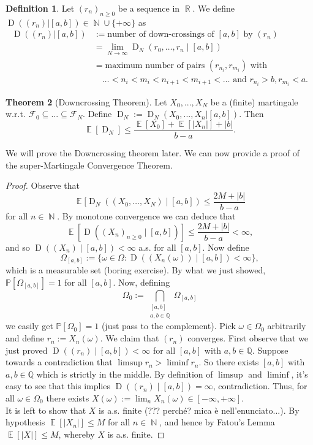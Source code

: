 \documentclass[12pt,a4paper]{report}
\theoremstyle{definition}
\newtheorem{theorem}{Theorem}[chapter] %
\newtheorem{definition}[theorem]{Definition}
\theoremstyle{num.custom-title}
\DeclareMathOperator{\E}{\mathbb{E}}
\DeclareMathOperator{\N}{\mathbb{N}}
\DeclareMathOperator{\R}{\mathbb{R}}
\DeclareMathOperator{\sse}{\subseteq}
\DeclareMathOperator{\D}{D}
\newcommand{\F}{\mathcal{F}}
\newcommand{\Q}{\mathbb{Q}}
\renewcommand{\1}{\mathbbm{1}}
\renewcommand{\P}{\mathbb{P}}
\begin{document}
\begin{definition}
	Let $(r_n)_{n \geq 0}$ be a sequence in $\R$. We define $\D((r_n)|[a,b]) \in \N \cup \{+\infty\}$ as
	\begin{align*}
	\D((r_n)|[a,b])
	&:= \text{number of down-crossings of $[a,b]$ by $(r_n)$} \\
	&= \lim_{N \to \infty} \D_N(r_0,\ldots,r_n \mid [a,b]) \\
	&= \text{maximum number of pairs $(r_{n_i},r_{m_i})$ with} \\
	&\quad \ldots < n_i < m_i < n_{i+1} < m_{i+1} < \ldots \text{ and } r_{n_i} > b, r_{m_i} < a.
	\end{align*}
\end{definition}

\begin{theorem}[Downcrossing Theorem]
	Let $X_0,...,X_N$ be a (finite) martingale w.r.t. $\F_0 \sse ... \sse \F_N$. Define $\D_N := \D_N(X_0,...,X_n | [a,b])$. Then
	\[
	\E[\D_N] \leq \frac{\E[X_0] + \E[|X_n|] + |b|}{b-a}.
	\]
\end{theorem}

We will prove the Downcrossing theorem later. We can now provide a proof of the super-Martingale Convergence Theorem.

\begin{proof}
	Observe that 
	\[
	\E[\D_N( (X_0,\ldots,X_N) \mid [a,b]) \leq \frac{2M+|b|}{b-a}
	\]
	for all $n \in \N$. By monotone convergence we can deduce that
	\[
	\E[\D( (X_n)_{n \geq 0} \mid [a,b])] \leq \frac{2M+|b|}{b-a} < \infty,
	\]
	and so $\D((X_n) \mid [a,b]) < \infty$ a.s. for all $[a,b]$. Now define
	\[
	\Omega_{[a,b]} := \{\omega \in \Omega : \D( (X_n(\omega)) \mid [a,b]) < \infty\},
	\]
	which is a measurable set (boring exercise). By what we just showed, $\P[\Omega_{[a,b]}] = 1$ for all $[a,b]$. Now, defining
	\[
	\Omega_0 := \bigcap_{\substack{[a,b] \\ a,b \in \Q}} \Omega_{[a,b]}
	\]
	we easily get $\P[\Omega_0]=1$ (just pass to the complement). Pick $\omega \in \Omega_0$ arbitrarily and define $r_n := X_n(\omega)$. We claim that $(r_n)$ converges. First observe that we just proved $\D( (r_n) \mid [a,b]) < \infty$ for all $[a,b]$ with $a,b \in \Q$. Suppose towards a contradiction that $\limsup r_n > \liminf r_n$. So there exists $[a,b]$ with $a,b \in \Q$ which is strictly in the middle. By definition of $\limsup$ and $\liminf$, it's easy to see that this implies $\D( (r_n) \mid [a,b])=\infty$, contradiction. Thus, for all $\omega \in \Omega_0$ there exists $X(\omega) := \lim_n X_n(\omega) \in [-\infty,+\infty]$.\\
	It is left to show that $X$ is a.s. finite (??? perché? mica è nell'enunciato...). By hypothesis $\E[|X_n|] \leq M$ for all $n \in \N$, and hence by Fatou's Lemma $\E[|X|] \leq M$, whereby $X$ is a.s. finite.
\end{proof}
\end{document}
